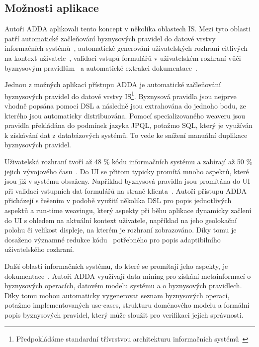\subsection{Možnosti aplikace}

Autoři \gls{ADDA} aplikovali tento koncept v několika oblastech \gls{IS}.
Mezi tyto oblasti patří automatické začleňování byznysových pravidel
do datové vrstvy informačních systémů~\cite{cemus2015automated}, automatické
generování uživatelských rozhraní citlivých na kontext uživatele~\cite{cemus2017separation},
validaci vstupů formulářů v uživatelském rozhraní vůči byznysovým pravidlům~\cite{cemus2016context}\cite{cemus2017separation}
a automatické extrakci dokumentace~\cite{cemus2017automated}.

Jednou z možných aplikací přístupu \gls{ADDA} je automatické začleňování
byznysových pravidel do datové vrstvy \gls{IS}\footnote{Předpokládáme standardní
třívrstvou architekturu informačních systémů~\cite{fowler2002patterns}}.
Byznysová pravidla jsou nejprve vhodně popsána pomocí \gls{DSL} a následně jsou
extrahována do jednoho bodu, ze kterého jsou automaticky distribuována.
Pomocí specializovaného weaveru jsou pravidla překládána do podmínek
jazyka \gls{JPQL}, potažmo \gls{SQL}, který je využíván k získávání dat
z databázových systémů. To vede ke snížení manuální duplikace byznysových
pravidel.

Uživatelská rozhraní tvoří až 48 \% kódu informačních systému
a zabírají až 50 \% jejich vývojového času~\cite{kennard2009separation}.
Do \gls{UI} se přitom typicky promítá mnoho aspektů, které jsou
již v systému obsaženy. Například byznysová pravidla jsou promítána do \gls{UI}
při validaci vstupních dat formulářů na straně klienta~\cite{cemus2017separation}.
Autoři přístupu \gls{ADDA} přicházejí s řešením v podobě
využití několika \gls{DSL} pro popis jednotlivých aspektů
a run-time weavingu, který aspekty při běhu aplikace
dynamicky začlení do \gls{UI} s ohledem na aktuální kontext
uživatele, například na jeho geolokační polohu či velikost
displeje, na kterém je rozhraní zobrazováno.
Díky tomu je dosaženo významné redukce kódu~\cite{cemus2016context}
potřebného pro popis adaptibilního uživatelského rozhraní.

Další oblastí informačních systému, do které se promítají jeho aspekty,
je dokumentace~\cite{cemus2017automated}. Autoři \gls{ADDA}
využívají data mining pro získání metainformací o byznysových operacích,
datovém modelu systému a o byznysových pravidlech. Díky tomu mohou
automaticky vygenerovat seznam byznysových operací, potažmo implementovaných
use-cases, strukturu doménového modelu a formální popis byznysových pravidel,
který může sloužit pro verifikaci jejich správnosti.

